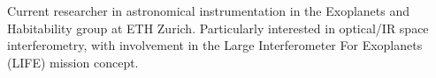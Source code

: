 

\begin{cvparagraph}

Current researcher in astronomical instrumentation in the Exoplanets and Habitability group at ETH Zurich. Particularly interested in optical/IR space interferometry, with involvement in the Large Interferometer For Exoplanets (LIFE) mission concept. 
\end{cvparagraph}
